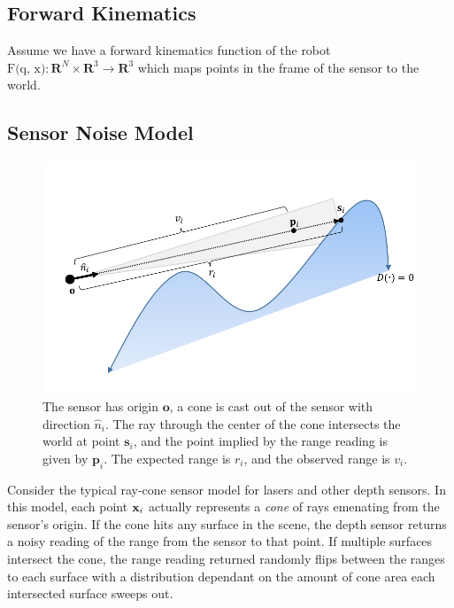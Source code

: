 \documentclass{article}
\begin{document}
\subsection{Forward Kinematics}

Assume we have a forward kinematics function of the robot $\text{F(q, x)} : \mathbf{R}^N \times \mathbf{R}^3 \to \mathbf{R}^3$ which maps points in the frame of the sensor to the world.

\subsection{Sensor Noise Model}

\begin{figure}
	\centering
	\includegraphics[width=1.0\textwidth]{img/raycone.pdf}
	\caption{The sensor has origin $\mathbf{o}$, a cone is cast out of the sensor with direction $\hat{n}_i$. The ray through the center of the cone intersects the world at point $\mathbf{s}_i$, and the point implied by the range reading is given by
	$\mathbf{p}_i$. The expected range is $r_i$, and the observed range is $v_i$.} 
	\label{fig:robot} 
\end{figure}

Consider the typical ray-cone sensor model for lasers and other depth sensors. In this model, each point $\mathbf{x}_i$ actually represents a \textit{cone} of rays emenating from the sensor's origin. If the cone hits any surface in the scene, the depth
sensor returns a noisy reading of the range from the sensor to that point. If multiple surfaces intersect the cone, the range reading returned randomly flips between the ranges to each surface with a distribution dependant on the amount of cone area
each intersected surface sweeps out.
\end{document}
